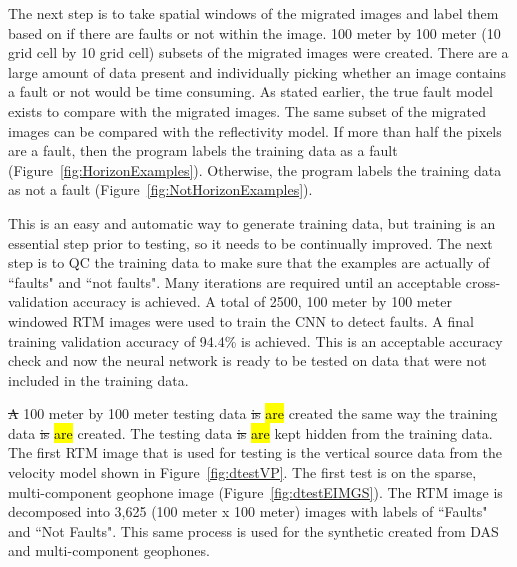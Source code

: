 The next step is to take spatial windows of the migrated images and label them based on if there are faults or not within the image. 100 meter by 100 meter (10 grid cell by 10 grid cell) subsets of the migrated images were created. There are a large amount of data present and individually picking whether an image contains a fault or not would be time consuming. As stated earlier, the true fault model exists to compare with the migrated images. The same subset of the migrated images can be compared with the reflectivity model. If more than half the pixels are a fault, then the program labels the training data as a fault (Figure~\ref{fig:HorizonExamples}). Otherwise, the program labels the training data as not a fault (Figure~\ref{fig:NotHorizonExamples}).


This is an easy and automatic way to generate training data, but training is an essential step prior to testing, so it needs to be continually improved. The next step is to QC the training data to make sure that the examples are actually of ``faults" and ``not faults". Many iterations are required until an acceptable cross-validation accuracy is achieved. A total of 2500, 100 meter by 100 meter windowed RTM images were used to train the CNN to detect faults. A final training validation accuracy of 94.4\% is achieved. This is an acceptable accuracy check and now the neural network is ready to be tested on data that were not included in the training data.

\sout{A} 100 meter by 100 meter testing data \sout{is} \hl{are} created the same way the training data \sout{is} \hl{are} created. The testing data \sout{is} \hl{are} kept hidden from the training data. The first RTM image that is used for testing is the vertical source data from the velocity model shown in Figure~\ref{fig:dtestVP}. The first test is on the sparse, multi-component geophone image (Figure~\ref{fig:dtestEIMGS}). The RTM image is decomposed into 3,625 (100 meter x 100 meter) images with labels of ``Faults" and ``Not Faults". This same process is used for the synthetic created from DAS and multi-component geophones.



